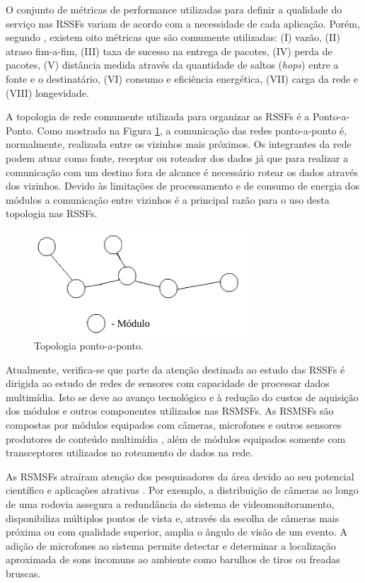 O conjunto de métricas de performance utilizadas para definir a qualidade do serviço nas \ac{RSSF}s variam de acordo com a necessidade de cada aplicação. Porém, segundo , existem oito métricas que são comumente utilizadas: (I) vazão, (II) atraso fim-a-fim, (III) taxa de sucesso na entrega de pacotes, (IV) perda de pacotes, (V) distância medida através da quantidade de saltos (\textit{hops}) entre a fonte e o destinatário, (VI) consumo e eficiência energética, (VII) carga da rede e (VIII) longevidade.

A topologia de rede comumente utilizada para organizar as \ac{RSSF}s é a Ponto-a-Ponto. Como mostrado na Figura \ref{TopologiaPontoAPonto}, a comunicação das redes ponto-a-ponto é, normalmente, realizada entre os vizinhos mais próximos. Os integrantes da rede podem atuar como fonte, receptor ou roteador dos dados já que para realizar a comunicação com um destino fora de alcance é necessário rotear os dados através dos vizinhos. Devido às limitações de processamento e de consumo de energia dos módulos a comunicação entre vizinhos é a principal razão para o uso desta topologia nas \ac{RSSF}s. 

\begin{figure}[!htb]
    \centering
    \includegraphics[width=8cm]{figs/redepontoaponto.png}
    \caption{Topologia ponto-a-ponto.}
    \label{TopologiaPontoAPonto}
\end{figure}


Atualmente, verifica-se que parte da atenção destinada ao estudo das \ac{RSSF}s é dirigida ao estudo de redes de sensores com capacidade de processar dados multimídia. Isto se deve ao avanço tecnológico e à redução do custos de aquisição dos módulos e outros componentes utilizados nas \ac{RSMSF}s. As \ac{RSMSF}s são compostas por módulos equipados com câmeras, microfones e outros sensores produtores de conteúdo multimídia \cite{Shakshuki}, além de módulos equipados somente com transceptores utilizados no roteamento de dados na rede. 

As \ac{RSMSF}s atraíram atenção dos pesquisadores da área devido ao seu potencial científico e aplicações atrativas \cite{Shen}. Por exemplo, a distribuição de câmeras ao longo de uma rodovia assegura a redundância do sistema de videomonitoramento, disponibiliza múltiplos pontos de vista e, através da escolha de câmeras mais próxima ou com qualidade superior, amplia o ângulo de visão de um evento. A adição de microfones ao sistema permite detectar e determinar a localização aproximada de sons incomuns ao ambiente como barulhos de tiros \cite{Ang} ou freadas bruscas.

